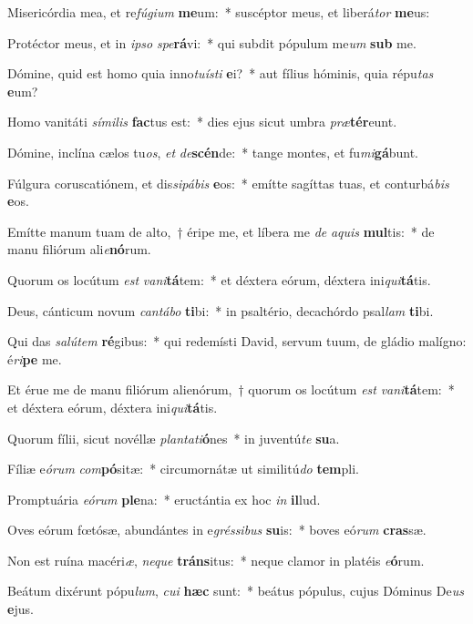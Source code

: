 \item Misericórdia mea, et re\textit{fú}\textit{gi}\textit{um} \textbf{me}um:~* suscéptor meus, et liberá\textit{tor} \textbf{me}us:
\item Protéctor meus, et in \textit{ip}\textit{so} \textit{spe}\textbf{rá}vi:~* qui subdit pópulum me\textit{um} \textbf{sub} me.
\item Dómine, quid est homo quia inno\textit{tu}\textit{ís}\textit{ti} \textbf{e}i?~* aut fílius hóminis, quia répu\textit{tas} \textbf{e}um?
\item Homo vanitáti \textit{sí}\textit{mi}\textit{lis} \textbf{fac}tus est:~* dies ejus sicut umbra \textit{præ}\textbf{tér}eunt.
\item Dómine, inclína cælos tu\textit{os}, \textit{et} \textit{de}\textbf{scén}de:~* tange montes, et fu\textit{mi}\textbf{gá}bunt.
\item Fúlgura coruscatiónem, et dis\textit{si}\textit{pá}\textit{bis} \textbf{e}os:~* emítte sagíttas tuas, et conturbá\textit{bis} \textbf{e}os.
\item Emítte manum tuam de alto,~† éripe me, et líbera me \textit{de} \textit{a}\textit{quis} \textbf{mul}tis:~* de manu filiórum ali\textit{e}\textbf{nó}rum.
\item Quorum os locútum \textit{est} \textit{va}\textit{ni}\textbf{tá}tem:~* et déxtera eórum, déxtera ini\textit{qui}\textbf{tá}tis.
\item Deus, cánticum novum \textit{can}\textit{tá}\textit{bo} \textbf{ti}bi:~* in psaltério, decachórdo psal\textit{lam} \textbf{ti}bi.
\item Qui das \textit{sa}\textit{lú}\textit{tem} \textbf{ré}gibus:~* qui redemísti David, servum tuum, de gládio malígno: é\textit{ri}\textbf{pe} me.
\item Et érue me de manu filiórum alienórum,~† quorum os locútum \textit{est} \textit{va}\textit{ni}\textbf{tá}tem:~* et déxtera eórum, déxtera ini\textit{qui}\textbf{tá}tis.
\item Quorum fílii, sicut novéllæ \textit{plan}\textit{ta}\textit{ti}\textbf{ó}nes~* in juventú\textit{te} \textbf{su}a.
\item Fíliæ e\textit{ó}\textit{rum} \textit{com}\textbf{pó}sitæ:~* circumornátæ ut similitú\textit{do} \textbf{tem}pli.
\item Promptuária \textit{e}\textit{ó}\textit{rum} \textbf{ple}na:~* eructántia ex hoc \textit{in} \textbf{il}lud.
\item Oves eórum fœtósæ, abundántes in e\textit{grés}\textit{si}\textit{bus} \textbf{su}is:~* boves eó\textit{rum} \textbf{cras}sæ.
\item Non est ruína macéri\textit{æ}, \textit{ne}\textit{que} \textbf{tráns}itus:~* neque clamor in platéis \textit{e}\textbf{ó}rum.
\item Beátum dixérunt pópu\textit{lum}, \textit{cu}\textit{i} \textbf{hæc} sunt:~* beátus pópulus, cujus Dóminus De\textit{us} \textbf{e}jus.
